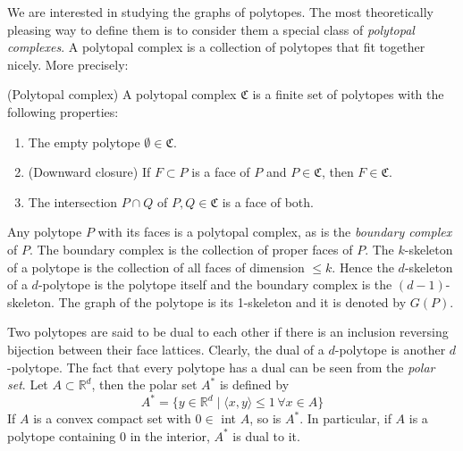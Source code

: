 We are interested in studying the graphs of polytopes. The most theoretically 
pleasing way to define them is to consider them a special class of 
\textit{polytopal complexes}.
A polytopal complex is a collection of polytopes that fit together nicely.
More precisely:
\begin{definition}
 (Polytopal complex) A polytopal complex $\mathfrak{C}$ is a finite set of 
polytopes with the following properties:
\begin{enumerate}
 \item The empty polytope $\emptyset \in \mathfrak{C}$.
  \item (Downward closure) If $F \subset P$ is a face of $P$ and $P \in 
\mathfrak{C}$, then 
$F \in \mathfrak{C}$.
\item The intersection $P\cap Q$ of $P,Q \in \mathfrak{C}$ is a face of both.

\end{enumerate}

\end{definition}

Any polytope $P$ with its faces is a polytopal complex, as is the 
\textit{boundary complex} of 
$P$. The boundary complex is the collection of proper faces of $P$.
The $k$-skeleton of a polytope is the collection of all faces of dimension $\leq 
k$. Hence the $d$-skeleton of a $d$-polytope is the polytope itself and the 
boundary complex is the $(d-1)$-skeleton. The graph of the polytope is its 
1-skeleton and it is denoted by $G(P)$.


Two polytopes are said to be dual to each other if there is an inclusion 
reversing bijection between their face lattices. Clearly, the dual of a 
$d$-polytope is another $d$-polytope. The fact that every polytope has a dual 
can be seen from the \textit{polar set}. Let $A\subset \mathbb{R}^d$, then the 
polar set $A^*$ is defined by
\begin{equation}
 A^* = \{y \in \mathbb{R}^d \mid \langle x,y\rangle \leq 1 \, \forall  x  \in A 
\} 
\end{equation}
If $A$ is a convex compact set with $0 \in$ int $A$, so is $A^*$. In 
particular, if $A$ is a polytope containing $0$ in the interior, $A^*$ is dual 
to it. 

